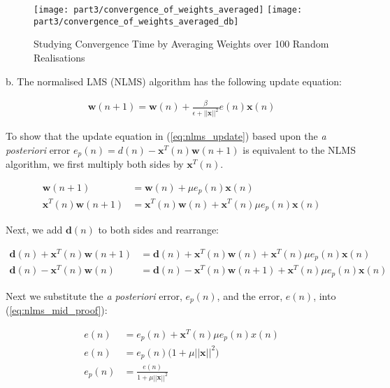 \begin{figure}[H]
\centering{}
\texttt{[image: part3/convergence\_of\_weights\_averaged]}
\texttt{[image: part3/convergence\_of\_weights\_averaged\_db]}
\caption{Studying Convergence Time by Averaging Weights over 100 Random Realisations}
\end{figure}


\noindent{}b. The normalised LMS (NLMS) algorithm has the following update equation:

\begin{align}
\textbf{w}(n+1) = \textbf{w}(n) + \frac{\beta}{\epsilon + ||\textbf{x}||^2} e(n)\textbf{x}(n)\label{eq:nlms_algo}
\end{align}

\noindent{}To show that the update equation in (\ref{eq:nlms_update}) based upon the \textit{a posteriori} error $e_p(n)=d(n)-\textbf{x}^T(n)\textbf{w}(n+1)$ is equivalent to the NLMS algorithm, we first multiply both sides by $\textbf{x}^T(n)$. 

\begin{align}
\textbf{w}(n+1) &= \textbf{w}(n) + \mu e_p(n)\textbf{x}(n) \label{eq:nlms_update}\\
\textbf{x}^T(n)\textbf{w}(n+1) &= \textbf{x}^T(n)\textbf{w}(n) + \textbf{x}^T(n) \mu e_p(n) \textbf{x}(n) \nonumber
\end{align}

\noindent{}Next, we add $\textbf{d}(n)$ to both sides and rearrange:

\begin{align}
\textbf{d}(n)+\textbf{x}^T(n)\textbf{w}(n+1) &= \textbf{d}(n)+\textbf{x}^T(n)\textbf{w}(n) + \textbf{x}^T(n) \mu e_p(n) \textbf{x}(n) \nonumber\\
\textbf{d}(n)-\textbf{x}^T(n)\textbf{w}(n) &= \textbf{d}(n)-\textbf{x}^T(n)\textbf{w}(n+1) + \textbf{x}^T(n) \mu e_p(n) \textbf{x}(n)\label{eq:nlms_mid_proof}
\end{align}

\noindent{}Next we substitute the \textit{a posteriori} error, $e_p(n)$, and the error, $e(n)$, into (\ref{eq:nlms_mid_proof}):

\begin{align}
e(n) &= e_p(n) + \textbf{x}^T(n) \mu e_p(n) x(n) \nonumber\\
e(n) &= e_p(n) \bigg(1+\mu ||\textbf{x}||^2\bigg) \nonumber\\
e_p(n) &= \frac{e(n)}{1+\mu||\textbf{x}||^2} \label{eq:a_posteriori_error}
\end{align}

